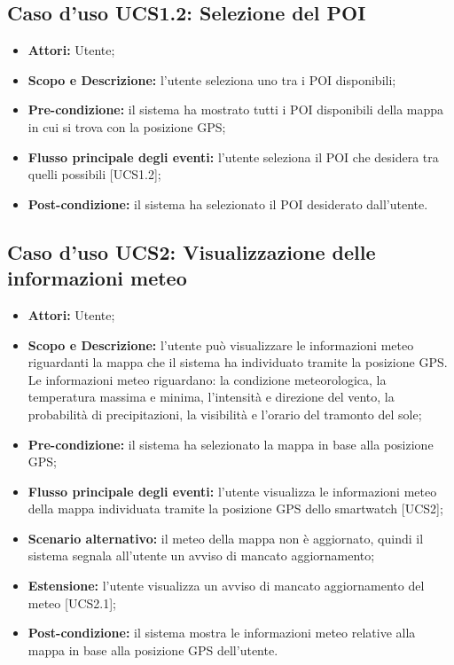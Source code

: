 \subsection{Caso d'uso UCS1.2: Selezione del POI}
\begin{itemize}
\item \textbf{Attori:} Utente;
\item \textbf{Scopo e Descrizione:} l'utente seleziona uno tra i POI disponibili;
\item \textbf{Pre-condizione:} il sistema ha mostrato tutti i POI disponibili della mappa in cui si trova con la posizione GPS;
\item \textbf{Flusso principale degli eventi:} l'utente seleziona il POI che desidera tra quelli possibili [UCS1.2]; 
\item \textbf{Post-condizione:} il sistema ha selezionato il POI desiderato dall'utente.
\end{itemize}

\subsection{Caso d'uso UCS2: Visualizzazione delle informazioni meteo}
\begin{itemize}
\item \textbf{Attori:} Utente;
\item \textbf{Scopo e Descrizione:} l'utente può visualizzare le informazioni meteo riguardanti la mappa che il sistema ha individuato tramite la posizione GPS. Le informazioni meteo riguardano: la condizione meteorologica, la temperatura massima e minima, l'intensità e direzione del vento, la probabilità di precipitazioni, la visibilità e l'orario del tramonto del sole;
\item \textbf{Pre-condizione:} il sistema ha selezionato la mappa in base alla posizione GPS;
\item \textbf{Flusso principale degli eventi:} l'utente visualizza le informazioni meteo della mappa individuata tramite la posizione GPS dello smartwatch [UCS2];
\item \textbf{Scenario alternativo:} il meteo della mappa non è aggiornato, quindi il sistema segnala all'utente un avviso di mancato aggiornamento;
\item \textbf{Estensione:} l'utente visualizza un avviso di mancato aggiornamento del meteo [UCS2.1];
\item \textbf{Post-condizione:} il sistema mostra le informazioni meteo relative alla mappa in base alla posizione GPS dell'utente.
\end{itemize}

